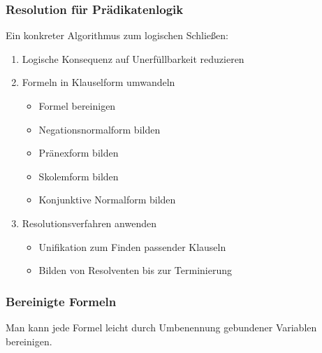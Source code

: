 \documentclass[onlymath]{beamer}
\begin{document}
\maketitle

\begin{frame}\frametitle{Resolution für Prädikatenlogik}

Ein konkreter Algorithmus zum logischen Schließen:
\begin{enumerate}[(1)]
\item \alert{Logische Konsequenz auf Unerfüllbarkeit reduzieren}
\item \alert{Formeln in Klauselform umwandeln}
	\begin{itemize}
	\item Formel bereinigen
	\item Negationsnormalform bilden
	\item \textcolor{devilscss}{Pränexform bilden}
	\item \textcolor{devilscss}{Skolemform bilden}
	\item \textcolor{devilscss}{Konjunktive Normalform bilden}
	\end{itemize}
\item \alert{Resolutionsverfahren anwenden}
	\begin{itemize}
	\item \textcolor{devilscss}{Unifikation zum Finden passender Klauseln}
	\item \textcolor{devilscss}{Bilden von Resolventen bis zur Terminierung}
	\end{itemize}
\end{enumerate}

\end{frame}


\begin{frame}\frametitle{Bereinigte Formeln}


Man kann jede Formel leicht durch Umbenennung gebundener Variablen
bereinigen.


\end{frame}
\end{document}
